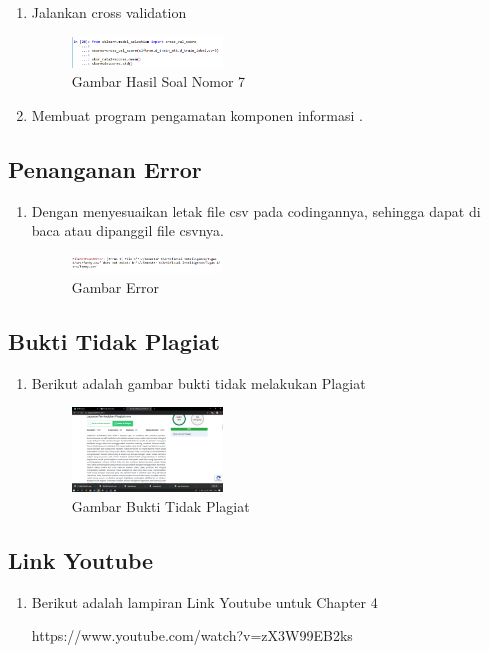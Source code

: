 \begin{enumerate}
\item Jalankan cross validation 

	\hfill\break
	

	\begin{figure}[H]
	\includegraphics[width=4cm]{figures/1174062/4/Teori/7.png}
	\centering
	\caption{Gambar Hasil Soal Nomor 7}
	\end{figure}

\item Membuat program pengamatan komponen informasi .

	\hfill\break
	
\end{enumerate}

\subsection{Penanganan Error}
\begin{enumerate}
\item Dengan menyesuaikan letak file csv pada codingannya, sehingga dapat  di baca atau dipanggil file csvnya.

	\begin{figure}[H]
	\centering
		\includegraphics[width=4cm]{figures/1174062/4/Error/1.png}
		\caption{Gambar Error}
	\end{figure}
\end{enumerate}

\subsection{Bukti Tidak Plagiat}
\begin{enumerate}
\item Berikut adalah gambar bukti tidak melakukan Plagiat

\begin{figure}[H]
	\centering
		\includegraphics[width=4cm]{figures/1174062/4/Plagiat/tidakplagiat.png}
		\caption{Gambar Bukti Tidak Plagiat}
	\end{figure}
\end{enumerate}

\subsection{Link Youtube}
\begin{enumerate}
\item Berikut adalah lampiran Link Youtube untuk Chapter 4

https://www.youtube.com/watch?v=zX3W99EB2ks
\end{enumerate}